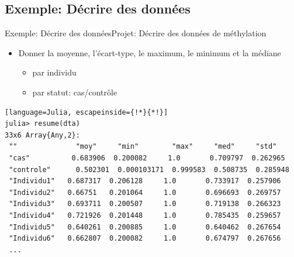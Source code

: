 \subsection{Exemple: Décrire des données}
\begin{frame}[containsverbatim]{\textcolor{goldenrod2}{Exemple:} Décrire des données}{Projet: Décrire des données de méthylation}
    \begin{itemize}
        \item Donner la moyenne, l'écart-type, le maximum, le minimum et la médiane
            \vspace{2ex}
            \begin{itemize}
                \item par individu
                \vspace{2ex}
                \item par statut: cas/contrôle
            \end{itemize}
    \end{itemize}
\begin{lstlisting}[language=Julia, escapeinside={!*}{*!}]
julia> resume(dta)
33x6 Array{Any,2}:
 ""              "moy"     "min"        "max"     "med"     "std"
 "cas"          0.683906  0.200082     1.0       0.709797  0.262965
 "controle"      0.502301  0.000103171  0.999583  0.508735  0.285948
 "Individu1"   0.687317  0.206128     1.0       0.733917  0.257906
 "Individu2"   0.66751   0.201064     1.0       0.696693  0.269757
 "Individu3"   0.693711  0.200507     1.0       0.719138  0.266323
 "Individu4"   0.721926  0.201448     1.0       0.785435  0.259657
 "Individu5"   0.640261  0.200885     1.0       0.640462  0.267654
 "Individu6"   0.662807  0.200082     1.0       0.674797  0.267656
 ...
\end{lstlisting}
\end{frame}



